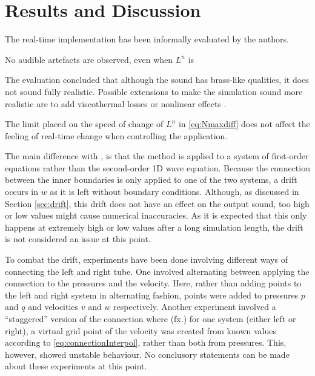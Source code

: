 \section{Results and Discussion}\label{sec:resDisc}
The real-time implementation has been informally evaluated by the authors. 

No audible artefacts are observed, even when $L^n$ is  

The evaluation concluded that although the sound has brass-like qualities, it does not sound fully realistic. Possible extensions to make the simulation sound more realistic are to add viscothermal losses \cite{Harrison2016} or nonlinear effects \cite{msallam1997physical}.

The limit placed on the speed of change of $L^n$ in \eqref{eq:Nmaxdiff} does not affect the feeling of real-time change when controlling the application.

The main difference with \cite{Willemsen2021}, is that the method is applied to a system of first-order equations rather than the second-order 1D wave equation. Because the connection between the inner boundaries is only applied to one of the two systems, a drift occurs in $w$ as it is left without boundary conditions. Although, as discussed in Section \ref{sec:drift}, this drift does not have an effect on the output sound, too high or low values might cause numerical inaccuracies. As it is expected that this only happens at extremely high or low values after a long simulation length, the drift is not considered an issue at this point. 

To combat the drift, experiments have been done involving different ways of connecting the left and right tube. One involved alternating between applying the connection to the pressures and the velocity. Here, rather than adding points to the left and right system in alternating fashion, points were added to pressures $p$ and $q$ and velocities $v$ and $w$ respectively. Another experiment involved a ``staggered'' version of the connection where (fx.) for one system (either left or right), a virtual grid point of the velocity was created from known values according to \eqref{eq:connectionInterpol}, rather than both from pressures. This, however, showed unstable behaviour. No conclusory statements can be made about these experiments at this point. 



